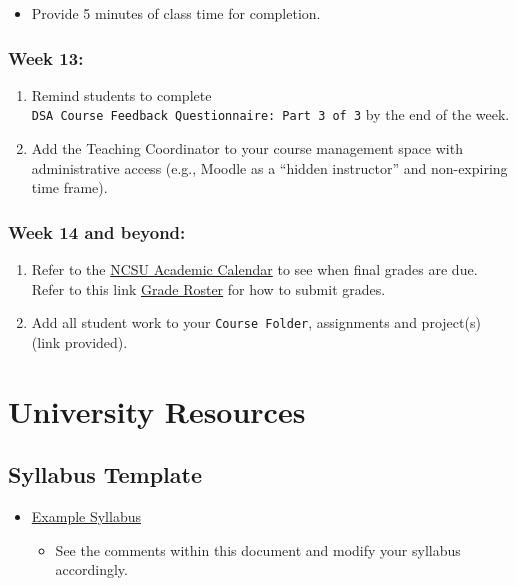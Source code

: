 \documentclass[
]{book}
\providecommand{\tightlist}{%
  \setlength{\itemsep}{0pt}\setlength{\parskip}{0pt}}
\begin{document}
\begin{itemize}
\tightlist
\item
  Provide 5 minutes of class time for completion.
\end{itemize}

\hypertarget{week-13}{%
\subsection{Week 13:}\label{week-13}}

\begin{enumerate}
\def\labelenumi{\arabic{enumi})}
\item
  Remind students to complete \texttt{DSA\ Course\ Feedback\ Questionnaire:\ Part\ 3\ of\ 3} by the end of the week.
\item
  Add the Teaching Coordinator to your course management space with administrative access (e.g., Moodle as a ``hidden instructor'' and non-expiring time frame).
\end{enumerate}

\hypertarget{week-14-and-beyond}{%
\subsection{Week 14 and beyond:}\label{week-14-and-beyond}}

\begin{enumerate}
\def\labelenumi{\arabic{enumi})}
\item
  Refer to the \href{https://studentservices.ncsu.edu/calendars/academic/}{NCSU Academic Calendar} to see when final grades are due. Refer to this link \href{https://sis.emas.ncsu.edu/faculty/faculty-center/\#grades}{Grade Roster} for how to submit grades.
\item
  Add all student work to your \texttt{Course\ Folder}, assignments and project(s) (link provided).
\end{enumerate}

\hypertarget{university-resources}{%
\chapter{University Resources}\label{university-resources}}

\hypertarget{syllabus-template}{%
\section{Syllabus Template}\label{syllabus-template}}

\begin{itemize}
\tightlist
\item
  \href{https://docs.google.com/document/d/12w-byO3kEmP4ofI8GIuDAbXkEOA3hwqVGXz3qRbX-l4/edit?usp=sharing}{Example Syllabus}

  \begin{itemize}
  \tightlist
  \item
    See the comments within this document and modify your syllabus accordingly.
  \end{itemize}
\end{itemize}
\end{document}
